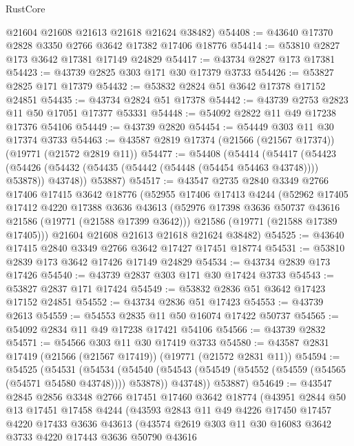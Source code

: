 \begin{lexlean}{RustCore}
\begin{coremodule}
      @21604
      @21608
      @21613
      @21618
      @21624
      @38482)
@54408 := @43640 @17370 @2828 @3350 @2766 @3642 @17382 @17406 @18776
@54414 := @53810 @2827 @173 @3642 @17381 @17149 @24829
@54417 := @43734 @2827 @173 @17381
@54423 := @43739 @2825 @303 @171 @30 @17379 @3733
@54426 := @53827 @2825 @171 @17379
@54432 := @53832 @2824 @51 @3642 @17378 @17152 @24851
@54435 := @43734 @2824 @51 @17378
@54442 := @43739 @2753 @2823 @11 @50 @17051 @17377 @53331
@54448 := @54092 @2822 @11 @49 @17238 @17376 @54106
@54449 := @43739 @2820
@54454 := @54449 @303 @11 @30 @17374 @3733
@54463 := @43587 @2819 @17374 (@21566 (@21567 @17374)) (@19771 (@21572 @2819 @11))
@54477 := @54408
    (@54414
      (@54417
        (@54423 (@54426 (@54432 (@54435 (@54442 (@54448 (@54454 @54463 @43748)))) @53878)) @43748))
      @53887)
@54517 := @43547
    @2735
    @2840
    @3349
    @2766
    @17406
    @17415
    @3642
    @18776
    (@52955
      @17406
      @17413
      @4244
      (@52962
        @17405
        @17412
        @4220
        @17388
        @3636
        @43613
        (@52976 @17398 @3636 @50737 @43616 @21586 (@19771 (@21588 @17399 @3642)))
        @21586
        (@19771 (@21588 @17389 @17405)))
      @21604
      @21608
      @21613
      @21618
      @21624
      @38482)
@54525 := @43640 @17415 @2840 @3349 @2766 @3642 @17427 @17451 @18774
@54531 := @53810 @2839 @173 @3642 @17426 @17149 @24829
@54534 := @43734 @2839 @173 @17426
@54540 := @43739 @2837 @303 @171 @30 @17424 @3733
@54543 := @53827 @2837 @171 @17424
@54549 := @53832 @2836 @51 @3642 @17423 @17152 @24851
@54552 := @43734 @2836 @51 @17423
@54553 := @43739 @2613
@54559 := @54553 @2835 @11 @50 @16074 @17422 @50737
@54565 := @54092 @2834 @11 @49 @17238 @17421 @54106
@54566 := @43739 @2832
@54571 := @54566 @303 @11 @30 @17419 @3733
@54580 := @43587 @2831 @17419 (@21566 (@21567 @17419)) (@19771 (@21572 @2831 @11))
@54594 := @54525
    (@54531
      (@54534
        (@54540 (@54543 (@54549 (@54552 (@54559 (@54565 (@54571 @54580 @43748)))) @53878)) @43748))
      @53887)
@54649 := @43547
    @2845
    @2856
    @3348
    @2766
    @17451
    @17460
    @3642
    @18774
    (@43951
      @2844
      @50
      @13
      @17451
      @17458
      @4244
      (@43593
        @2843
        @11
        @49
        @4226
        @17450
        @17457
        @4220
        @17433
        @3636
        @43613
        (@43574
          @2619
          @303
          @11
          @30
          @16083
          @3642
          @3733
          @4220
          @17443
          @3636
          @50790
          @43616

\end{coremodule}
\end{lexlean}
